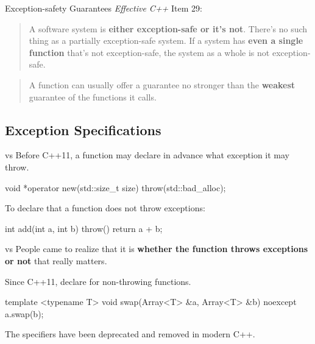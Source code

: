 \documentclass{beamer}
\begin{document}
\begin{frame}{Exception-safety Guarantees}
  \textit{Effective C++} Item 29:
  \begin{quotation}
    A software system is \textbf{either exception-safe or it's not}. There's no such thing as a partially exception-safe system. If a system has \textbf{even a single function} that's not exception-safe, the system as a whole is not exception-safe.
  \end{quotation}
  \pause
  \begin{quotation}
    A function can usually offer a guarantee no stronger than the \textbf{weakest} guarantee of the functions it calls.
  \end{quotation}
\end{frame}

\subsection{Exception Specifications}

\begin{frame}[fragile]{ vs }
  Before C++11, a function may declare in advance what exception it may throw.
  \begin{cpp}
void *operator new(std::size_t size) throw(std::bad_alloc);
  \end{cpp}
  \pause
  To declare that a function does not throw exceptions:
  \begin{cpp}
int add(int a, int b) throw() {
  return a + b;
}
  \end{cpp}
\end{frame}

\begin{frame}[fragile]{ vs }
  People came to realize that it is \textbf{whether the function throws exceptions or not} that really matters.\par
  \pause
  Since C++11, declare  for non-throwing functions.
  \begin{cpp}
template <typename T>
void swap(Array<T> &a, Array<T> &b) noexcept {
  a.swap(b);
}
  \end{cpp}
  \pause
  The  specifiers have been deprecated and removed in modern C++.
\end{frame}
\end{document}
